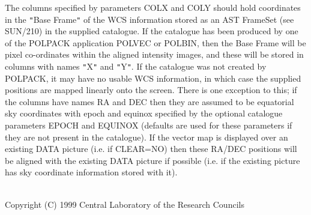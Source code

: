 \documentclass[twoside,11pt]{article}
\newcommand{\htmlref}[2]{#1}
\newcommand{\xref}[3]{#1}
\renewcommand{\_}{\texttt{\symbol{95}}}
\newcommand{\sstdiytopic}[2]{\item[{\hspace{-0.35em}#1\hspace{-0.35em}:}]
\mbox{} \\[1.3ex] #2}
\newcommand{\sstitem}{\item}
\newcommand{\sstdiytopic}[2]{\item[{#1}] #2 }
\newcommand{\sstitem}{\item}
\begin{document}
{{{         \sstitem
         The columns specified by parameters COLX and COLY should hold
         coordinates in the {\tt "}Base Frame{\tt "} of the WCS information stored as
         an AST FrameSet (see \xref{SUN/210}{sun210}{}) in the supplied catalogue. If the
         catalogue has been produced by one of the POLPACK application \htmlref{POLVEC}{POLVEC}
         or \htmlref{POLBIN}{POLBIN}, then the Base Frame will be pixel co-ordinates within the
         aligned intensity images, and these will be stored in columns with
         names {\tt "}X{\tt "} and {\tt "}Y{\tt "}. If the catalogue was not created by POLPACK, it
         may have no usable WCS information, in which case the supplied
         positions are mapped linearly onto the screen. There is one
         exception to this; if the columns have names RA and DEC then they
         are assumed to be equatorial sky coordinates with epoch and equinox
         specified by the optional catalogue parameters EPOCH and EQUINOX
         (defaults are used for these parameters if they are not present in the
         catalogue). If the vector map is displayed over an existing DATA
         picture (i.e. if CLEAR=NO) then these RA/DEC positions will be aligned
         with the existing DATA picture if possible (i.e. if the existing
         picture has sky coordinate information stored with it).
      }
   }
   \sstdiytopic{
      Copyright
   }{
      Copyright (C) 1999 Central Laboratory of the Research Councils
   }
}
\end{document}
